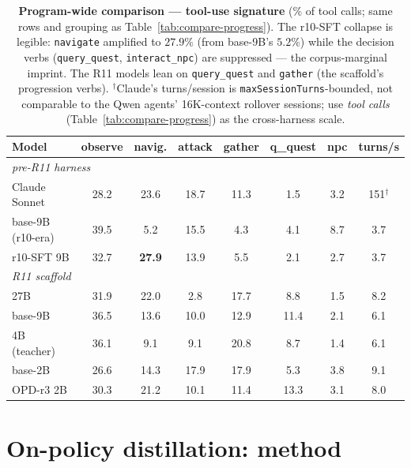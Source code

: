 \documentclass[11pt]{article}
\begin{document}
\begin{table}[t]
\centering\small
\setlength{\tabcolsep}{4.5pt}
\caption{\textbf{Program-wide comparison --- tool-use signature} (\% of tool calls; same rows and
grouping as Table~\ref{tab:compare-progress}). The r10-SFT collapse is legible: \texttt{navigate}
amplified to $27.9\%$ (from base-9B's $5.2\%$) while the decision verbs (\texttt{query\_quest},
\texttt{interact\_npc}) are suppressed --- the corpus-marginal imprint. The R11 models lean on
\texttt{query\_quest} and \texttt{gather} (the scaffold's progression verbs).
$^\dagger$Claude's turns/session is \texttt{maxSessionTurns}-bounded, not comparable to the Qwen
agents' 16K-context rollover sessions; use \emph{tool calls} (Table~\ref{tab:compare-progress}) as
the cross-harness scale.}
\label{tab:compare-tools}
\begin{tabular}{lccccccc}
\toprule
Model & observe & navig. & attack & gather & q\_quest & npc & turns/s \\
\midrule
\multicolumn{8}{l}{\emph{pre-R11 harness}} \\
\quad Claude Sonnet & 28.2 & 23.6 & 18.7 & 11.3 & 1.5 & 3.2 & 151$^\dagger$ \\
\quad base-9B (r10-era) & 39.5 & 5.2 & 15.5 & 4.3 & 4.1 & 8.7 & 3.7 \\
\quad r10-SFT 9B & 32.7 & \textbf{27.9} & 13.9 & 5.5 & 2.1 & 2.7 & 3.7 \\
\midrule
\multicolumn{8}{l}{\emph{R11 scaffold}} \\
\quad 27B & 31.9 & 22.0 & 2.8 & 17.7 & 8.8 & 1.5 & 8.2 \\
\quad base-9B & 36.5 & 13.6 & 10.0 & 12.9 & 11.4 & 2.1 & 6.1 \\
\quad 4B (teacher) & 36.1 & 9.1 & 9.1 & 20.8 & 8.7 & 1.4 & 6.1 \\
\quad base-2B & 26.6 & 14.3 & 17.9 & 17.9 & 5.3 & 3.8 & 9.1 \\
\quad OPD-r3 2B & 30.3 & 21.2 & 10.1 & 11.4 & 13.3 & 3.1 & 8.0 \\
\bottomrule
\end{tabular}
\end{table}

\section{On-policy distillation: method}
\end{document}
